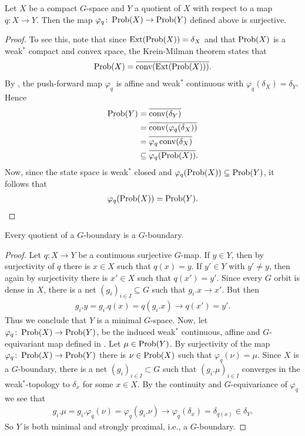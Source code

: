 \begin{corollary}\label{induce cor}
Let $X$ be a compact $G$-space and $Y$ a quotient of $X$ with respect to a map $q \colon X \to Y$. Then the map $\varphi_q \colon \operatorname{Prob}(X) \to \operatorname{Prob}(Y)$ defined above is surjective.
\begin{proof}
To see this, note that since $\operatorname{Ext}(\operatorname{Prob}(X))=\delta_X$ and that $\operatorname{Prob}(X)$ is a weak$^*$ compact and convex space, the Krein-Milman theorem states that 
\begin{align*}
\operatorname{Prob}(X)=\overline{\text{conv}(\operatorname{Ext}(\operatorname{Prob}(X)))}.
\end{align*}
By , the push-forward map $\varphi_q$ is affine and weak$^*$ continuous with $\varphi_q(\delta_X)=\delta_Y$. Hence
\begin{align*}
\operatorname{Prob}(Y)&=\overline{\operatorname{conv}(\delta_{Y})}\\
&=\overline{\operatorname{conv}(\varphi_{q}(\delta_{X}))}\\
&=\overline{\varphi_{q} \operatorname{conv}(\delta_{X})}\\
&\subseteq \overline{\varphi_{q}(\operatorname{Prob}(X))}.
\end{align*}
Now, since the state space is weak$^*$ closed and $\varphi_{q}(\operatorname{Prob}(X))\subseteq \operatorname{Prob}(Y)$, it follows that
\begin{align*}
\varphi_{q}(\operatorname{Prob}(X))=\operatorname{Prob}(Y).
\end{align*}
\end{proof}
\end{corollary}

\begin{proposition}
Every quotient of a $G$-boundary is a $G$-boundary.
\begin{proof}
Let $q \colon X \to Y$ be a continuous surjective $G$-map. If $y \in Y$, then by surjectivity of $q$ there is $x \in X$ such that $q(x)=y$. If $y' \in Y$ with $y' \neq y$, then again by surjectivity there is $x' \in X$ such that $q(x')=y'$. Since every $G$ orbit is dense in $X$, there is a net $(g_{i})_{i \in I} \subseteq G$ such that $g_{i}.x\to x'$. But then
\begin{align*}
g_{i}.y=g_{i}.q(x)=q(g_{i}.x)\to q(x')=y'.
\end{align*}
Thus we conclude that $Y$ is a minimal $G$-space. Now, let $\varphi_{q} \colon \operatorname{Prob}(X) \to \operatorname{Prob}(Y)$, be the induced weak$^*$ continuous, affine and $G$-equivariant map defined in . Let $\mu \in \operatorname{Prob}(Y)$. By surjectivity of the map $\varphi_{q} \colon \operatorname{Prob}(X) \to \operatorname{Prob}(Y)$ there is $\nu \in \operatorname{Prob}(X)$ such that $\varphi_{q}(\nu)=\mu$. Since $X$ is a $G$-boundary, there is a net $(g_{i})_{i \in I} \subset G$ such that $(g_{i}.\mu)_{i \in I} $ converges in the weak$^*$-topology to $\delta_{x}$ for some $x \in X$. By the continuity and $G$-equivariance of $\varphi_{q}$ we see that
\begin{align*}
g_{i}. \mu = g_{i}.\varphi_{q}(\nu)=\varphi_{q}(g_{i}. \nu) \to \varphi_{q}(\delta_{x}) = \delta_{q(x)} \in \delta_{Y}.
\end{align*}
So $Y$ is both minimal and strongly proximal, i.e., a $G$-boundary.
\end{proof}
\end{proposition}


